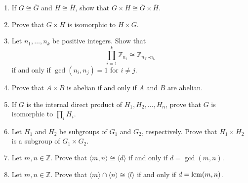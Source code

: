{\begin{enumerate}
\item
If $G \cong \overline{G}$ and $H \cong \overline{H}$, show that $G
\times H \cong \overline{G} \times \overline{H}$.
 

\item
Prove that $G \times H$ is isomorphic to $H \times G$.
 

\item
Let $n_1, \ldots, n_k$ be positive integers. Show that
$$
\prod_{i=1}^k {\mathbb Z}_{n_i} \cong {\mathbb Z}_{n_1 \cdots n_k}
$$
if and only if $\gcd( n_i, n_j) =1$ for $i \neq j$.
 

\item
Prove that $A \times B$ is abelian if and only if $A$ and $B$ are
abelian. 
 

\item
If $G$ is the internal direct product of $H_1, H_2, \ldots, H_n$,
prove that $G$ is isomorphic to $\prod_i H_i$. 
 

\item
Let $H_1$ and $H_2$ be subgroups of $G_1$ and $G_2$, respectively. Prove that $H_1 \times H_2$ is a subgroup of $G_1 \times G_2$. 
 

\item
Let $m, n \in {\mathbb Z}$. Prove that $\langle m,n \rangle \cong \langle d \rangle$ if and only if $d = \gcd(m,n)$.
 

\item
Let $m, n \in {\mathbb Z}$. Prove that $\langle m \rangle \cap \langle n \rangle \cong \langle l \rangle$ if and only if $d = \operatorname{lcm}(m,n)$. 
 
\end{enumerate}
}





